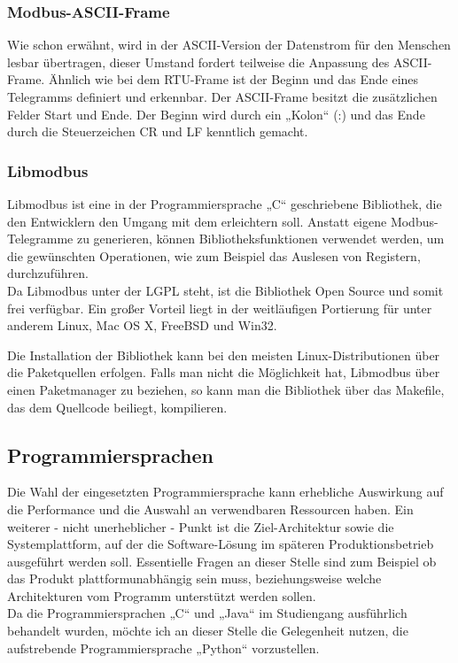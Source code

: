 \documentclass[../Bachelorarbeit.tex]{subfiles}
\begin{document}
\subsubsection*{Modbus-\acs{ASCII}-Frame}
Wie schon erwähnt, wird in der \acs{ASCII}-Version der Datenstrom für den Menschen lesbar 
übertragen, dieser Umstand fordert teilweise die Anpassung des \acs{ASCII}-Frame. Ähnlich wie
bei dem \acs{RTU}-Frame ist der Beginn und das Ende eines Telegramms definiert und 
erkennbar. Der \acs{ASCII}-Frame besitzt die zusätzlichen Felder Start und Ende. Der Beginn 
wird durch ein „Kolon“ (:) und das Ende durch die Steuerzeichen \ac{CR} und \ac{LF} kenntlich gemacht. 
\parencite[vgl.][S. 80]{modbus_dipl_arbeit}

\subsubsection*{Libmodbus}
\label{para:libmodbus}
Libmodbus ist eine in der Programmiersprache „C“ geschriebene Bibliothek, die den 
Entwicklern den Umgang mit dem  erleichtern soll. Anstatt eigene Modbus-Telegramme 
zu generieren, können Bibliotheksfunktionen verwendet werden, um die gewünschten 
Operationen, wie zum Beispiel das Auslesen von Registern, durchzuführen. \\
Da Libmodbus unter der \ac{LGPL} steht, ist die Bibliothek Open Source und somit frei verfügbar. Ein großer Vorteil liegt in der weitläufigen
Portierung für unter anderem Linux, Mac OS X, FreeBSD und Win32.
\begin{comment}
Die Installation unter Linux ist relativ trivial, da die meisten Distributionen die Bibliothek über die Paketquellen anbieten.
\end{comment}
Die Installation der Bibliothek kann bei den meisten Linux-Distributionen über die Paketquellen erfolgen. 
Falls man nicht die Möglichkeit hat, Libmodbus über einen Paketmanager zu 
beziehen, so kann man die Bibliothek über das Makefile, das dem Quellcode beiliegt, 
kompilieren. 

\subsection{Programmiersprachen}
Die Wahl der eingesetzten Programmiersprache kann erhebliche Auswirkung auf die 
Performance und die Auswahl an verwendbaren Ressourcen haben. Ein weiterer - nicht unerheblicher - Punkt ist die Ziel-Architektur sowie die Systemplattform, auf der die Software-Lösung im späteren Produktionsbetrieb ausgeführt werden soll. 
Essentielle 
Fragen an dieser Stelle sind zum Beispiel ob das Produkt plattformunabhängig sein muss,
beziehungsweise welche Architekturen vom Programm unterstützt werden sollen. \\
Da die Programmiersprachen „C“ und „Java“ im Studiengang ausführlich behandelt 
wurden, möchte ich an dieser Stelle die Gelegenheit nutzen, die aufstrebende 
Programmiersprache „Python“ vorzustellen.
\end{document}
